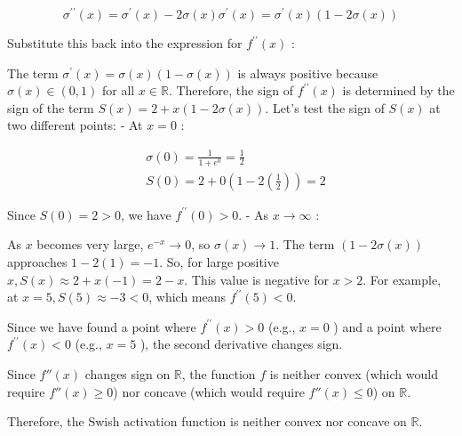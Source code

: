\begin{enumerate}
    $$
    \sigma^{\prime \prime}(x)=\sigma^{\prime}(x)-2 \sigma(x) \sigma^{\prime}(x)=\sigma^{\prime}(x)(1-2 \sigma(x))
    $$
    
    Substitute this back into the expression for $f^{\prime \prime}(x)$ :

        The term $\sigma^{\prime}(x)=\sigma(x)(1-\sigma(x))$ is always positive because $\sigma(x) \in(0,1)$ for all $x \in \mathbb{R}$.
        Therefore, the sign of $f^{\prime \prime}(x)$ is determined by the sign of the term $S(x)=2+x(1-2 \sigma(x))$.
        Let's test the sign of $S(x)$ at two different points:
        - At $x=0$ :

        $$
        \begin{aligned}
        & \sigma(0)=\frac{1}{1+e^0}=\frac{1}{2} \\
        & S(0)=2+0\left(1-2\left(\frac{1}{2}\right)\right)=2
        \end{aligned}
        $$


        Since $S(0)=2>0$, we have $f^{\prime \prime}(0)>0$.
        - As $x \rightarrow \infty$ :

        As $x$ becomes very large, $e^{-x} \rightarrow 0$, so $\sigma(x) \rightarrow 1$.
        The term $(1-2 \sigma(x))$ approaches $1-2(1)=-1$.
        So, for large positive $x, S(x) \approx 2+x(-1)=2-x$. This value is negative for $x>2$. For example, at $x=5, S(5) \approx-3<0$, which means $f^{\prime \prime}(5)<0$.

        Since we have found a point where $f^{\prime \prime}(x)>0$ (e.g., $x=0$ ) and a point where $f^{\prime \prime}(x)<0$ (e.g., $x=5$ ), the second derivative changes sign.
    
    Since $f''(x)$ changes sign on $\mathbb{R}$, the function $f$ is neither convex (which would require $f''(x) \geq 0$) nor concave (which would require $f''(x) \leq 0$) on $\mathbb{R}$.
    
    Therefore, the Swish activation function is neither convex nor concave on $\mathbb{R}$.
    
\end{enumerate}
